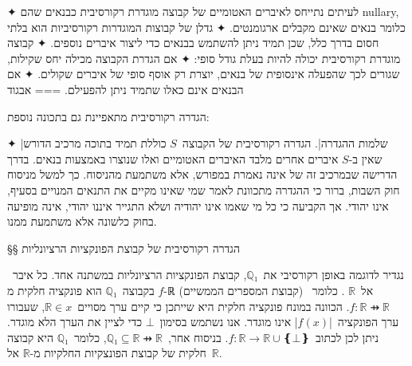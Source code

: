 ✦ לעיתים נתייחס לאיברים האטומיים של קבוצה מוגדרת רקורסיבית כבנאים שהם nullary,
כלומר בנאים שאינם מקבלים ארגומנטים.
✦ גדלן של קבוצות המוגדרות רקורסיביות הוא בלתי חסום בדרך כלל, שכן תמיד ניתן
להשתמש בבנאים כדי ליצור איברים נוספים.
✦ קבוצה מוגדרת רקורסיבית יכולה להיות בעלת גודל סופי:
✦ אם הגדרת הקבוצה מכילה יחס שקילות, שגורים לכך שהפעלה אינסופית של בנאים, יוצרת
רק אוסף סופי של איברים שקולים.
✦ אם הבנאים אינם כאלו שתמיד ניתן להפעילם.
===
{אבגוד}

הגדרה רקורסיבית מתאפיינת גם בתכונה נוספת:
\begin{itemize}
✦ \ע|שלמות ההגדרה|. הגדרה רקורסיבית של הקבוצה~$S$ כוללת תמיד בתוכה מרכיב
הדורש שאין ב-$S$ איברים אחרים מלבד האיברים האטומיים ואלו שנוצרו באמצעות בנאים.
בדרך הדרישה שבמרכיב זה של אינה נאמרת במפורש, אלא משתמעת מהניסוח. כך למשל מניסוח
חוק השבות, ברור כי ההגדרה מתכוונת לאמר שמי שאינו מקיים את התנאים המנויים בסעיף,
אינו יהודי. אך הקביעה כי כל מי שאמו אינו יהודיה ושלא התגייר איננו יהודי, אינה
מופיעה בחוק כלשונה אלא משתמעת ממנו.
\end{itemize}

§§ הגדרה רקורסיבית של קבוצת הפונקציות הרציונליות

נגדיר לדוגמה באופן רקורסיבי את~$ℚ₁$, קבוצת הפונקציות הרציונליות במשתנה אחד. כל
איבר~$f$ בקבוצה~$ℚ₁$ הוא פונקציה חלקית מ-ℝ (קבוצת המספרים הממשיים) אל~$ℝ$ .
כלומר~$f:ℝ⇸ℝ$. הכוונה במונח פונקציה חלקית היא שייתכן כי קיים ערך מסויים~$ℝ∈x$,
שעבורו ערך הפונקציה~\E|$f(x)$| אינו מוגדר. אנו נשתמש בסימון~$⊥$ כדי לציין את הערך
הלא מוגדר. ניתן לכן לכתוב~$f:ℝ→ℝ∪❴⊥❵$. בניסוח אחר,~$ℚ₁⊆ℝ⇸ℝ$, כלומר~$ℚ₁$ היא
קבוצה חלקית של קבוצת הפונצקיות החלקיות מ-$ℝ$ אל~$ℝ$.

